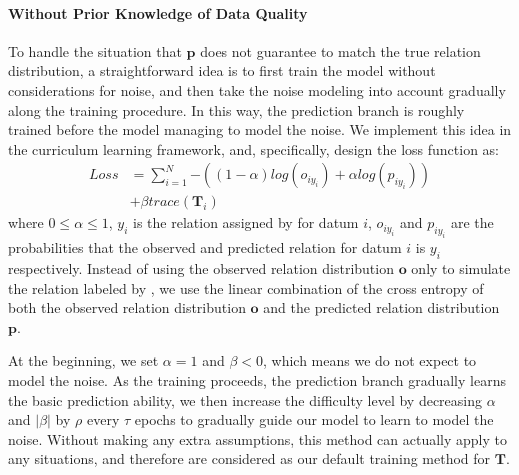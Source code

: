 \paragraph{Without Prior Knowledge of Data Quality}
To handle the situation that $\mathbf{p}$ does not guarantee to match the true relation distribution, a straightforward idea is to first train the model without considerations for noise,  and then take the noise modeling into account gradually along the training procedure. In this way, the prediction branch is roughly trained before the model managing to model the noise. We implement this idea in the curriculum learning framework, and,  specifically, 
design the loss function as:
%
%
\begin{equation}
\begin{aligned}
Loss	&=\sum_{i=1}^N{-((1-\alpha) log(o_{iy_{i}}) + \alpha log(p_{iy_{i}}))} \\
&+ \beta trace(\mathbf{T}_{i})
\end{aligned}
\label{general_loss}
\end{equation}
where $0\le\alpha\le1$, $y_i$ is the relation assigned by \DS for datum $i$, $o_{iy_{i}}$ and $p_{iy_{i}}$ are the probabilities that the observed and predicted relation for datum $i$ is $y_i$ respectively. Instead of using the observed relation distribution $\mathbf{o}$ only to simulate the relation labeled by \DS, we use the linear combination of the cross entropy of both the observed relation distribution $\mathbf{o}$ and the predicted relation distribution $\mathbf{p}$. 

At the beginning, we set $\alpha=1$ and $\beta<0$, which means we do not expect to model the noise. As the training proceeds, the prediction branch gradually learns the basic prediction ability, we then increase the difficulty level by decreasing $\alpha$ and  $|\beta|$ by $\rho$ every $\tau$ epochs to gradually guide our model to learn to model the noise. Without making any extra assumptions, this method can actually apply to any situations, and therefore are considered as our default training method for $\mathbf{T}$.

